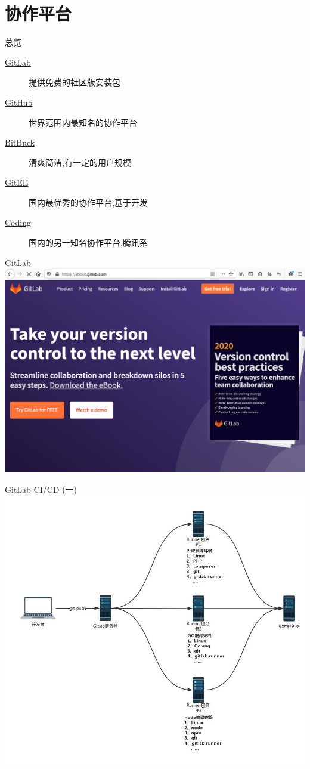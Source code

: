 \section{协作平台}

\begin{frame}{总览}
    \begin{description}
        \item[\href{https://gitlab.com}{GitLab}] 提供免费的社区版安装包
        \item[\href{https://github.com}{GitHub}] 世界范围内最知名的协作平台
        \item[\href{https://bitbucket.com}{BitBuck}] 清爽简洁,有一定的用户规模
        \item[\href{https://gitee.com}{GitEE}] 国内最优秀的协作平台,基于开发
        \item[\href{https://coding.net}{Coding}] 国内的另一知名协作平台,腾讯系
    \end{description}
\end{frame}

\begin{frame}{GitLab}
    \centering
    \includegraphics[scale=0.24]{figures/gitlab.png}
\end{frame}

\begin{frame}{GitLab CI/CD (一)}
    \centering
    \includegraphics[height=32ex,width=48ex]{figures/gitlab-cicd2.jpg}
\end{frame}

